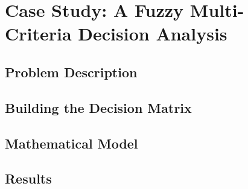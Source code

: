 \chapter{Case Study: A Fuzzy Multi-Criteria Decision Analysis}

\section{Problem Description}

\section{Building the Decision Matrix}

\section{Mathematical Model}

\section{Results}
